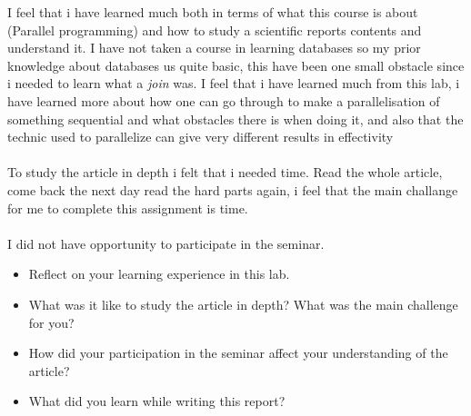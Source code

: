 \documentclass[a4paper,12pt]{article}
\begin{document}
I feel that i have learned much both in terms of what this course is about (Parallel programming) and how to study a scientific reports contents and understand it.
I have not taken a course in learning databases so my prior knowledge about databases us quite basic, this have been one small obstacle since i needed to learn what a \emph{join} was.
I feel that i have learned much from this lab, i have learned more about how one can go through to make a parallelisation of something sequential and what obstacles there is when doing it,
and also that the technic used to parallelize can give very different results in effectivity
\\\\
To study the article in depth i felt that i needed time. Read the whole article, come back the next day read the hard parts again, i feel that the main challange for me to complete this assignment is time.
\\\\
I did not have opportunity to participate in the seminar.

\begin{itemize}
\item Reflect on your learning experience in this lab.
\item What was it like to study the article in depth? What was the main challenge for you? 
\item How did your participation in the seminar affect your understanding of the article?
\item What did you learn while writing this report?
\end{itemize}
\end{document}
